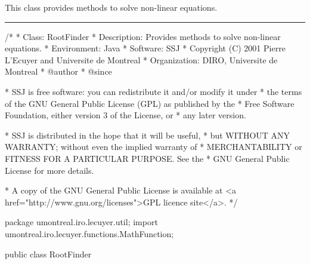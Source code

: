 
This class provides methods to solve non-linear equations.

\bigskip\hrule

\begin{code}
\begin{hide}
/*
 * Class:        RootFinder
 * Description:  Provides methods to solve non-linear equations.
 * Environment:  Java
 * Software:     SSJ
 * Copyright (C) 2001  Pierre L'Ecuyer and Universite de Montreal
 * Organization: DIRO, Universite de Montreal
 * @author
 * @since

 * SSJ is free software: you can redistribute it and/or modify it under
 * the terms of the GNU General Public License (GPL) as published by the
 * Free Software Foundation, either version 3 of the License, or
 * any later version.

 * SSJ is distributed in the hope that it will be useful,
 * but WITHOUT ANY WARRANTY; without even the implied warranty of
 * MERCHANTABILITY or FITNESS FOR A PARTICULAR PURPOSE.  See the
 * GNU General Public License for more details.

 * A copy of the GNU General Public License is available at
   <a href="http://www.gnu.org/licenses">GPL licence site</a>.
 */
\end{hide}
package umontreal.iro.lecuyer.util;
   import umontreal.iro.lecuyer.functions.MathFunction;


public class RootFinder\begin{hide} {
   private static final double MINVAL = 5.0e-308;
   private RootFinder() {}\end{hide}
\end{code}


